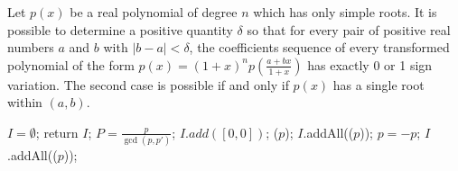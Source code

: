 \begin{comment}
A modern version of the algorithm has been invented by \cite{collin76}. The original method  firstly map all the positive real roots in $(0,1)$, then use bisection strategy and show
that if transformations $H_{\frac{1}{2}}$ and $H_{\frac{1}{2}}T$ are applied iteratively on any square-free polynomial $P$, one obtain, after a finite number of transformations,
a polynomial $Q$ such that $V(Q)\le 1$. \cite{akr80} modify the subdivision strategy, simply say, it recursion  computer the lower bound $b$ of positive real roots and shift
$x\leftarrow x+b$, then  first search the real roots in interval $(0,1]$ later in interval $(1,+\infty)$. Until all the positive real roots been found.

The correctness of all the algorithms are based on Theorem  \ref{thm:des}. The proof of the termination and complexity computation of their algorithms is base on the following theorems:
\end{comment}



\begin{theorem}\label{thm:vin}
  Let $p(x)$ be a real polynomial of degree $n$ which has only simple roots. It is possible to determine a positive quantity $\delta$ so that for every pair of positive real numbers $a$ and $b$ with $|b-a| < \delta$, the coefficients sequence of every transformed polynomial of the form
  $  p(x) = (1+x)^{n}p(\frac{a+bx}{1+x}) $
		  has exactly 0 or 1 sign variation. The second case is possible if and only if $p(x)$ has a single root within $(a,b)$.
\end{theorem}

\begin{algorithm}
\caption{\algm \label{alg:main}}
\DontPrintSemicolon
{}
$I=\emptyset$; \;
 {return $I$;}
$P=\frac{p}{\gcd(p,p')}$; 
 { $I.add([0,0])$; 
\dec($p$);  }
$I$.addAll(\algcf($p$)); \;
 
$p=-p$;\;
$I$.addAll(\algcf($p$)); %
\end{algorithm}

